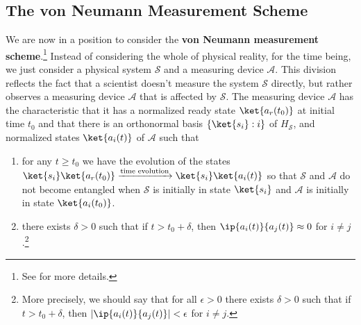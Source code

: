     
    \subsection{The von Neumann Measurement Scheme}\label{vonNeumannMeasurement}
    \addtocounter{footnote}{-1}
    \addtocounter{footnote}{1}
    
    We are now in a position to consider the \textbf{von Neumann measurement scheme}.\footnote{See \cite[50-53]{Schlosshauer} for more details.} Instead of considering the whole of physical reality, for the time being, we just consider a physical system $\mathcal{S}$ and a measuring device $\mathcal{A}$. This division reflects the fact that a scientist doesn't measure the system $\mathcal{S}$ directly, but rather observes a measuring device $\mathcal{A}$ that is affected by $\mathcal{S}$. The measuring device $\mathcal{A}$ has the characteristic that it has a normalized ready state $\ket{a_r(t_0)}$ at initial time $t_0$ and that there is an orthonormal basis $\{\ket{s_i}:i\}$ of $H_\mathcal{S}$, and normalized states $\ket{a_i(t)}$ of $\mathcal{A}$ such that
    \begin{enumerate}[noitemsep, nosep, topsep=0pt] 
    \item for any $t\geq t_0$ we have the evolution of the states \label{vonNeumannMeasurement1}
    $\ket{s_i}\ket{a_r(t_0)}\xrightarrow{\text{time evolution}}\ket{s_i}\ket{a_i(t)}$ so that $\mathcal{S}$ and $\mathcal{A}$ do not become entangled when $\mathcal{S}$ is initially in state $\ket{s_i}$ and $\mathcal{A}$ is initially in state $\ket{a_i(t_0)}$.
    \item there exists $\delta>0$ such that if $t> t_0+\delta$, then $\ip{a_i(t)}{a_j(t)}\approx 0$ for $i\neq j$.\footnote{\label{approx}More precisely, we should say that for all $\epsilon >0$ there exists $\delta>0$ such that if $t> t_0+\delta$, then $|\ip{a_i(t)}{a_j(t)}|<\epsilon$ for $i\neq j$.}
    \end{enumerate}
